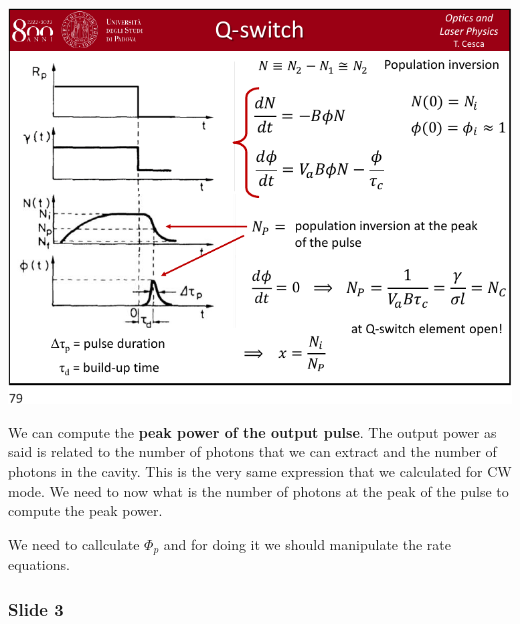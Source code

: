 \documentclass[../main/main.tex]{subfiles}
\begin{document}
\begin{minipage}[]{0.5\linewidth}
\centering
\includegraphics[page=2,width=1\textwidth]{../lessons/pdf_file/15_lecture.pdf}
\end{minipage}
\hspace{0.3cm}\vspace{0.3cm}
\begin{minipage}[c]{0.47\linewidth}

We can compute the \textbf{peak power of the output pulse}. The output power as said is related to the number of photons that we can extract and the number of photons in the cavity. This is the very same expression that we calculated for CW mode. We need to now what is the number of photons at the peak of the pulse to compute the peak power.

We need to callculate \( \Phi_p \) and for doing it we should manipulate the rate equations.

\end{minipage}

\subsubsection*{Slide 3}
\end{document}
